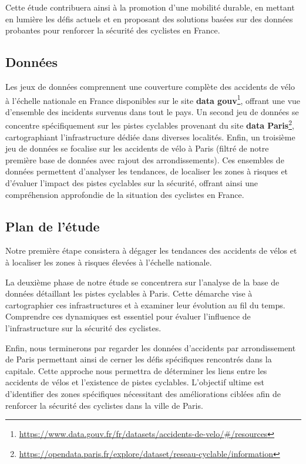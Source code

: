 \documentclass[french,]{compterendu}
\let\rmarkdownfootnote\footnote%
\def\footnote{\protect\rmarkdownfootnote}
\theoremstyle{urcastyle}
\theoremstyle{remark}
\begin{document}
Cette étude contribuera ainsi à la promotion d'une mobilité durable, en mettant en lumière les défis actuels et en proposant des solutions basées sur des données probantes pour renforcer la sécurité des cyclistes en France.

\hypertarget{donnuxe9es}{%
\subsection{Données}\label{donnuxe9es}}

Les jeux de données comprennent une couverture complète des accidents de vélo à l'échelle nationale en France disponibles sur le site \textbf{data gouv}\footnote{\url{https://www.data.gouv.fr/fr/datasets/accidents-de-velo/\#/resources}}, offrant une vue d'ensemble des incidents survenus dans tout le pays. Un second jeu de données se concentre spécifiquement sur les pistes cyclables provenant du site \textbf{data Paris}\footnote{\url{https://opendata.paris.fr/explore/dataset/reseau-cyclable/information}}, cartographiant l'infrastructure dédiée dans diverses localités. Enfin, un troisième jeu de données se focalise sur les accidents de vélo à Paris (filtré de notre première base de données avec rajout des arrondissements). Ces ensembles de données permettent d'analyser les tendances, de localiser les zones à risques et d'évaluer l'impact des pistes cyclables sur la sécurité, offrant ainsi une compréhension approfondie de la situation des cyclistes en France.

\hypertarget{plan-de-luxe9tude}{%
\subsection{Plan de l'étude}\label{plan-de-luxe9tude}}

Notre première étape consistera à dégager les tendances des accidents de vélos et à localiser les zones à risques élevées à l'échelle nationale.

La deuxième phase de notre étude se concentrera sur l'analyse de la base de données détaillant les pistes cyclables à Paris. Cette démarche vise à cartographier ces infrastructures et à examiner leur évolution au fil du temps. Comprendre ces dynamiques est essentiel pour évaluer l'influence de l'infrastructure sur la sécurité des cyclistes.

Enfin, nous terminerons par regarder les données d'accidents par arrondissement de Paris permettant ainsi de cerner les défis spécifiques rencontrés dans la capitale. Cette approche nous permettra de déterminer les liens entre les accidents de vélos et l'existence de pistes cyclables. L'objectif ultime est d'identifier des zones spécifiques nécessitant des améliorations ciblées afin de renforcer la sécurité des cyclistes dans la ville de Paris.
\end{document}

